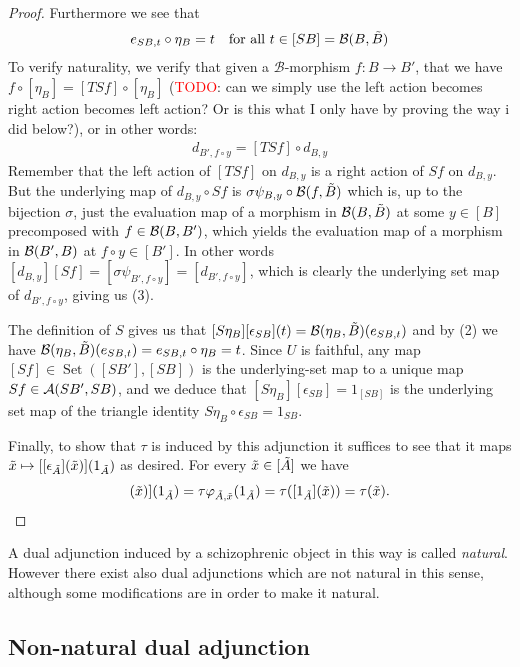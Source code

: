 \documentclass[12pt,a4paper]{article}
\DeclareMathOperator{\Set}{Set}
\def\HomA{\ensuremath\mathcal{A}}
\def\HomB{\ensuremath\mathcal{B}}
\def\t{\ensuremath\tilde}
\begin{document}
\begin{proof}
Furthermore we see that \begin{align}
	e_{SB, t} \circ \eta_B = t \ \ \text{ for all } t \in [SB]= \HomB(B, \t B)
\end{align}
To verify naturality, we verify that given a $\mathcal{B}$-morphism $f: B \to B'$, that we have $f \circ [\eta_B] = [TSf] \circ [\eta_B]$ (\textcolor{red}{TODO}: can we simply use the left action becomes right action becomes left action? Or is this what I only have by proving the way i did below?), or in other words: \begin{align}
	d_{B', f \circ y} = [TSf] \circ d_{B,y}
\end{align} 
Remember that the left action of $[TSf]$ on $d_{B,y}$ is a right action of $Sf$ on $d_{B,y}$. But the underlying map of $d_{B,y} \circ Sf$ is $\sigma \psi_{B,y} \circ \HomB(f, \t B)$ which is, up to the bijection $\sigma$, just the evaluation map of a morphism in $\HomB(B, \t B)$ at some $y \in [B]$ precomposed with $f \in \HomB(B, B')$, which yields the evaluation map of a morphism in $\HomB(B',B)$ at $f \circ y \in [B']$. In other words $[d_{B,y}] [Sf] = [\sigma \psi_{B', f \circ y}] = [d_{B', f \circ y}]$, which is clearly the underlying set map of $d_{B', f \circ y}$, giving us (3). 



The definition of $S$ gives us that $[S\eta_B][\epsilon_{SB}](t) = \HomB(\eta_B, \t B)(e_{SB, t})$ and by (2) we have $\HomB(\eta_B, \t B)(e_{SB, t}) = e_{SB,t} \circ \eta_B = t$. Since $U$ is faithful, any map $[Sf] \in \Set([SB'], [SB])$ is the underlying-set map to a unique map $Sf \in \HomA(SB', SB)$, and we deduce that $[S\eta_B][\epsilon_{SB}] = 1_{[SB]}$ is the underlying set map of the triangle identity $S\eta_B \circ \epsilon_{SB} = 1_{SB}$.

Finally, to show that $\tau$ is induced by this adjunction it suffices to see that it maps $\t x \mapsto [[\epsilon_{\t A}](\t x)](1_{\t A})$ as desired. For every $\t x \in [\t A]$ we have
\begin{align*}
	[[\epsilon_{\t A}](\t x)](1_{\t A}) = \tau \varphi_{\t A, \t x}(1_{\t A}) = \tau([1_{\t A}](\t x)) = \tau(\t x).
\end{align*}
\end{proof}
A dual adjunction induced by a schizophrenic object in this way is called \emph{natural}. However there exist also dual adjunctions which are not natural in this sense, although some modifications are in order to make it natural. 
\subsection{Non-natural dual adjunction}
\end{document}
